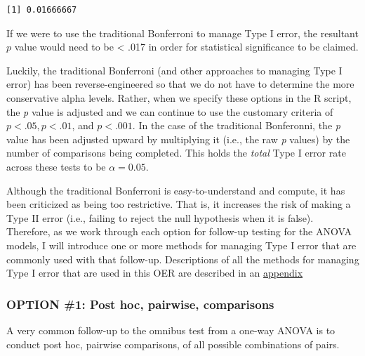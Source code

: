 \documentclass[
  11pt,
]{book}
\begin{document}
\begin{verbatim}
[1] 0.01666667
\end{verbatim}

If we were to use the traditional Bonferroni to manage Type I error, the resultant \(p\) value would need to be \textless{} .017 in order for statistical significance to be claimed.

Luckily, the traditional Bonferroni (and other approaches to managing Type I error) has been reverse-engineered so that we do not have to determine the more conservative alpha levels. Rather, when we specify these options in the R script, the \emph{p} value is adjusted and we can continue to use the customary criteria of \(p < .05, p < .01\), and \(p < .001\). In the case of the traditional Bonferonni, the \emph{p} value has been adjusted upward by multiplying it (i.e., the raw \emph{p} values) by the number of comparisons being completed. This holds the \emph{total} Type I error rate across these tests to be \(\alpha = 0.05\).

Although the traditional Bonferroni is easy-to-understand and compute, it has been criticized as being too restrictive. That is, it increases the risk of making a Type II error (i.e., failing to reject the null hypothesis when it is false). Therefore, as we work through each option for follow-up testing for the ANOVA models, I will introduce one or more methods for managing Type I error that are commonly used with that follow-up. Descriptions of all the methods for managing Type I error that are used in this OER are described in an \protect\hyperlink{type1}{appendix}

\hypertarget{option-1-post-hoc-pairwise-comparisons}{%
\subsubsection{OPTION \#1: Post hoc, pairwise, comparisons}\label{option-1-post-hoc-pairwise-comparisons}}

A very common follow-up to the omnibus test from a one-way ANOVA is to conduct post hoc, pairwise comparisons, of all possible combinations of pairs.
\end{document}
